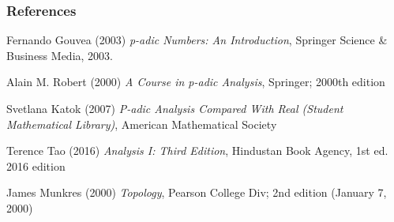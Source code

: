 \documentclass{beamer}
\begin{document}
    \begin{frame}
        \frametitle{References}
        \begin{thebibliography}{9}
            Fernando Gouvea (2003) \emph{p-adic Numbers: An Introduction}, Springer Science \& Business Media, 2003.
            
            Alain M. Robert (2000) \emph{A Course in p-adic Analysis}, Springer; 2000th edition
        
            Svetlana Katok (2007) \emph{P-adic Analysis Compared With Real (Student Mathematical Library)}, American Mathematical Society
            
            Terence Tao (2016) \emph{Analysis I: Third Edition}, Hindustan Book Agency, 1st ed. 2016 edition
        
            James Munkres (2000) \emph{Topology}, Pearson College Div; 2nd edition (January 7, 2000)
          \end{thebibliography}
        
    
    \end{frame}
\end{document}
